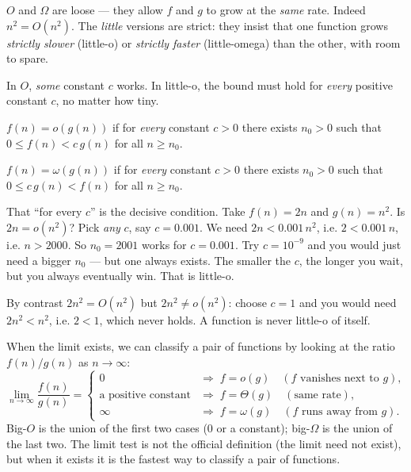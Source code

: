 $O$ and $\Omega$ are loose --- they allow $f$ and $g$ to grow at the \emph{same} rate.
Indeed $n^2 = O(n^2)$. The \emph{little} versions are strict: they insist that one
function grows \emph{strictly slower} (little-o) or \emph{strictly faster}
(little-omega) than the other, with room to spare.

In $O$, \emph{some} constant $c$ works. In little-o, the bound must hold for \emph{every} positive constant $c$, no matter how tiny.

\begin{formalbox}
\begin{definition}[little-o]\label{ch03:def-littleo}
$f(n) = o(g(n))$ if for \emph{every} constant $c>0$ there exists $n_0>0$ such that
$0 \le f(n) < c\,g(n)$ for all $n \ge n_0$.
\end{definition}
\begin{definition}\label{ch03:def-littleomega}
$f(n) = \omega(g(n))$ if for \emph{every} constant $c>0$ there exists $n_0>0$ such that
$0 \le c\,g(n) < f(n)$ for all $n \ge n_0$.
\end{definition}
\end{formalbox}

That ``for every $c$'' is the decisive condition. Take $f(n) = 2n$ and $g(n) = n^2$. Is
$2n = o(n^2)$? Pick \emph{any} $c$, say $c = 0.001$. We need $2n < 0.001\,n^2$, i.e.
$2 < 0.001\,n$, i.e. $n > 2000$. So $n_0 = 2001$ works for $c=0.001$. Try $c = 10^{-9}$
and you would just need a bigger $n_0$ --- but one always exists. The smaller the $c$,
the longer you wait, but you always eventually win. That is little-o.

By contrast $2n^2 = O(n^2)$ but $2n^2 \ne o(n^2)$: choose $c = 1$ and you would need
$2n^2 < n^2$, i.e. $2 < 1$, which never holds. A function is never little-o of itself.

\begin{intuitionbox}
When the limit exists, we can classify a pair of functions by looking at the ratio $f(n)/g(n)$ as $n\to\infty$:
\[
  \lim_{n\to\infty}\frac{f(n)}{g(n)} =
  \begin{cases}
    0 & \Rightarrow\; f = o(g)\quad(\text{$f$ vanishes next to $g$}),\\[2pt]
    \text{a positive constant} & \Rightarrow\; f = \Theta(g)\quad(\text{same rate}),\\[2pt]
    \infty & \Rightarrow\; f = \omega(g)\quad(\text{$f$ runs away from $g$}).
  \end{cases}
\]
Big-$O$ is the union of the first two cases ($0$ or a constant); big-$\Omega$ is the
union of the last two. The limit test is not the official definition (the limit need
not exist), but when it exists it is the fastest way to classify a pair of functions.
\end{intuitionbox}

